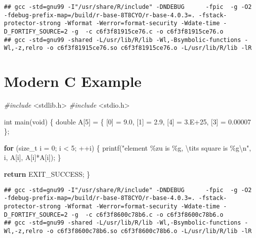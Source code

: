 \documentclass[
]{book}
\newenvironment{Shaded}{\begin{snugshade}}{\end{snugshade}}
\newcommand{\ControlFlowTok}[1]{\textcolor[rgb]{0.13,0.29,0.53}{\textbf{#1}}}
\newcommand{\DataTypeTok}[1]{\textcolor[rgb]{0.13,0.29,0.53}{#1}}
\newcommand{\DecValTok}[1]{\textcolor[rgb]{0.00,0.00,0.81}{#1}}
\newcommand{\FloatTok}[1]{\textcolor[rgb]{0.00,0.00,0.81}{#1}}
\newcommand{\ImportTok}[1]{#1}
\newcommand{\NormalTok}[1]{#1}
\newcommand{\PreprocessorTok}[1]{\textcolor[rgb]{0.56,0.35,0.01}{\textit{#1}}}
\newcommand{\SpecialCharTok}[1]{\textcolor[rgb]{0.00,0.00,0.00}{#1}}
\newcommand{\StringTok}[1]{\textcolor[rgb]{0.31,0.60,0.02}{#1}}
\begin{document}
\begin{verbatim}
## gcc -std=gnu99 -I"/usr/share/R/include" -DNDEBUG      -fpic  -g -O2 -fdebug-prefix-map=/build/r-base-8T8CYO/r-base-4.0.3=. -fstack-protector-strong -Wformat -Werror=format-security -Wdate-time -D_FORTIFY_SOURCE=2 -g  -c c6f3f81915ce76.c -o c6f3f81915ce76.o
## gcc -std=gnu99 -shared -L/usr/lib/R/lib -Wl,-Bsymbolic-functions -Wl,-z,relro -o c6f3f81915ce76.so c6f3f81915ce76.o -L/usr/lib/R/lib -lR
\end{verbatim}

\hypertarget{modern-c-example}{%
\section{Modern C Example}\label{modern-c-example}}

\begin{Shaded}
\begin{Highlighting}[]
\PreprocessorTok{\#include }\ImportTok{\textless{}stdlib.h\textgreater{}}
\PreprocessorTok{\#include }\ImportTok{\textless{}stdio.h\textgreater{}}

\DataTypeTok{int}\NormalTok{ main(}\DataTypeTok{void}\NormalTok{) \{}
    \DataTypeTok{double}\NormalTok{ A[}\DecValTok{5}\NormalTok{] = \{}
\NormalTok{            [}\DecValTok{0}\NormalTok{] = }\FloatTok{9.0}\NormalTok{,}
\NormalTok{            [}\DecValTok{1}\NormalTok{] = }\FloatTok{2.9}\NormalTok{,}
\NormalTok{            [}\DecValTok{4}\NormalTok{] = }\FloatTok{3.E+25}\NormalTok{,}
\NormalTok{            [}\DecValTok{3}\NormalTok{] = }\FloatTok{0.00007}
\NormalTok{    \};}

    \ControlFlowTok{for}\NormalTok{ (}\DataTypeTok{size\_t}\NormalTok{ i = }\DecValTok{0}\NormalTok{; i \textless{} }\DecValTok{5}\NormalTok{; ++i) \{}
\NormalTok{        printf(}\StringTok{"element \%zu is \%g, }\SpecialCharTok{\textbackslash{}t}\StringTok{its square is \%g}\SpecialCharTok{\textbackslash{}n}\StringTok{"}\NormalTok{,}
\NormalTok{               i,}
\NormalTok{               A[i],}
\NormalTok{               A[i]*A[i]);}
\NormalTok{    \}}

    \ControlFlowTok{return}\NormalTok{ EXIT\_SUCCESS;}
\NormalTok{\}}
\end{Highlighting}
\end{Shaded}

\begin{verbatim}
## gcc -std=gnu99 -I"/usr/share/R/include" -DNDEBUG      -fpic  -g -O2 -fdebug-prefix-map=/build/r-base-8T8CYO/r-base-4.0.3=. -fstack-protector-strong -Wformat -Werror=format-security -Wdate-time -D_FORTIFY_SOURCE=2 -g  -c c6f3f8600c78b6.c -o c6f3f8600c78b6.o
## gcc -std=gnu99 -shared -L/usr/lib/R/lib -Wl,-Bsymbolic-functions -Wl,-z,relro -o c6f3f8600c78b6.so c6f3f8600c78b6.o -L/usr/lib/R/lib -lR
\end{verbatim}
\end{document}
